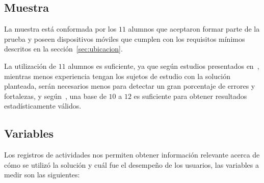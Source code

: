 
\subsection{Muestra}

La muestra está conformada por los $11$ alumnos que aceptaron formar parte de 
la prueba y poseen dispositivos móviles que cumplen con los requisitos
mínimos descritos en la sección~\ref{sec:ubicacion}.

La utilización de $11$ alumnos es suficiente, ya que según estudios presentados
en~\cite{nielsen2000}, mientras menos experiencia tengan los sujetos de estudio
con la solución planteada, serán necesarios menos para detectar un gran
porcentaje de errores y fortalezas, y según~\cite{ritch2009}, una base de $10$ a
$12$ es suficiente para obtener resultados estadísticamente válidos.

\subsection{Variables}


Los registros de actividades nos permiten obtener información relevante acerca
de cómo se utilizó la solución y cuál fue el desempeño de los usuarios, las variables a medir son 
las siguientes:


